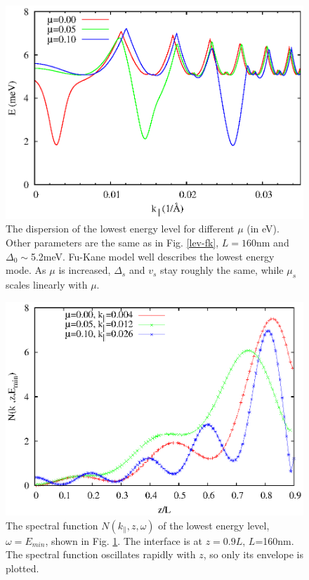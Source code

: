 \begin{figure}
\center
\includegraphics[width=\textwidth]{include/disp-mu.eps}
\caption{The dispersion of the lowest energy level
for different $\mu$ (in eV). Other parameters
are the same as in Fig. \ref{lev-fk}, $L=160$nm and $\Delta_0\sim$5.2meV. Fu-Kane model
well describes the lowest energy mode. As $\mu$ is increased, 
$\Delta_s$ and $v_s$ stay roughly the same, while $\mu_s$ scales
linearly with $\mu$.
}\label{lev-chem}
\end{figure}

\begin{figure}
\center
\includegraphics[width=\textwidth]{include/spweight.eps}
\caption{The spectral function $N(k_\parallel,z,\omega)$ of the lowest 
energy level, $\omega=E_{min}$, shown in Fig. \ref{lev-chem}. 
The interface is at $z=0.9L$, $L$=160nm.
The spectral function oscillates rapidly with $z$, so only its envelope is plotted.
}\label{sp}
\end{figure}

